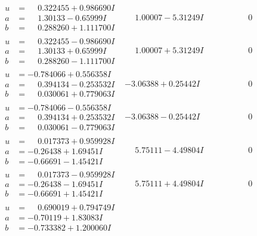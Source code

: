 \documentclass[1p]{elsarticle_modified}
\theoremstyle{definition}
\begin{document}
$$\begin{array}{c|c|c}
\begin{aligned}
u &= \phantom{-}0.322455 + 0.986690 I \\
a &= \phantom{-}1.30133 - 0.65999 I \\
b &= \phantom{-}0.288260 + 1.111700 I\end{aligned}
 & \phantom{-}1.00007 - 5.31249 I & \phantom{-0.000000 } 0 \\ \hline\begin{aligned}
u &= \phantom{-}0.322455 - 0.986690 I \\
a &= \phantom{-}1.30133 + 0.65999 I \\
b &= \phantom{-}0.288260 - 1.111700 I\end{aligned}
 & \phantom{-}1.00007 + 5.31249 I & \phantom{-0.000000 } 0 \\ \hline\begin{aligned}
u &= -0.784066 + 0.556358 I \\
a &= \phantom{-}0.394134 - 0.253532 I \\
b &= \phantom{-}0.030061 + 0.779063 I\end{aligned}
 & -3.06388 + 0.25442 I & \phantom{-0.000000 } 0 \\ \hline\begin{aligned}
u &= -0.784066 - 0.556358 I \\
a &= \phantom{-}0.394134 + 0.253532 I \\
b &= \phantom{-}0.030061 - 0.779063 I\end{aligned}
 & -3.06388 - 0.25442 I & \phantom{-0.000000 } 0 \\ \hline\begin{aligned}
u &= \phantom{-}0.017373 + 0.959928 I \\
a &= -0.26438 + 1.69451 I \\
b &= -0.66691 - 1.45421 I\end{aligned}
 & \phantom{-}5.75111 - 4.49804 I & \phantom{-0.000000 } 0 \\ \hline\begin{aligned}
u &= \phantom{-}0.017373 - 0.959928 I \\
a &= -0.26438 - 1.69451 I \\
b &= -0.66691 + 1.45421 I\end{aligned}
 & \phantom{-}5.75111 + 4.49804 I & \phantom{-0.000000 } 0 \\ \hline\begin{aligned}
u &= \phantom{-}0.690019 + 0.794749 I \\
a &= -0.70119 + 1.83083 I \\
b &= -0.733382 + 1.200060 I\end{aligned}

\end{array}$$
\end{document}
